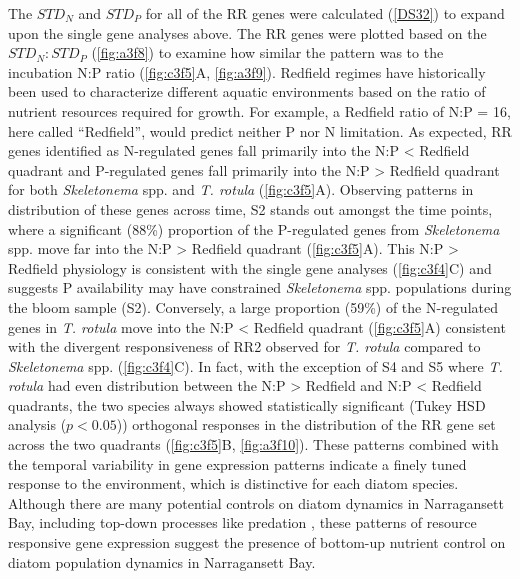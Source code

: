 The $STD_N$ and $STD_P$ for all of the RR genes were calculated (\ref{DS32}) to expand upon the single gene analyses above. The RR genes were plotted based on the $STD_N : STD_P$ (\cref{fig:a3f8}) to examine how similar the pattern was to the incubation N:P ratio (\cref{fig:c3f5}A, \cref{fig:a3f9}). Redfield regimes have historically been used to characterize different aquatic environments based on the ratio of nutrient resources required for growth. For example, a Redfield ratio of N:P = 16, here called ``Redfield'', would predict neither P nor N limitation. As expected, RR genes identified as N-regulated genes fall primarily into the N:P < Redfield quadrant and P-regulated genes fall primarily into the N:P > Redfield quadrant for both \textit{Skeletonema} spp. and \textit{T. rotula} (\cref{fig:c3f5}A). Observing patterns in distribution of these genes across time, S2 stands out amongst the time points, where a significant (88\%) proportion of the P-regulated genes from \textit{Skeletonema} spp. move far into the N:P > Redfield quadrant (\cref{fig:c3f5}A). This N:P > Redfield physiology is consistent with the single gene analyses (\cref{fig:c3f4}C) and suggests P availability may have constrained \textit{Skeletonema} spp. populations during the bloom sample (S2). Conversely, a large proportion (59\%) of the N-regulated genes in \textit{T. rotula} move into the N:P < Redfield quadrant (\cref{fig:c3f5}A) consistent with the divergent responsiveness of RR2 observed for \textit{T. rotula} compared to \textit{Skeletonema} spp. (\cref{fig:c3f4}C). In fact, with the exception of S4 and S5 where \textit{T. rotula} had even distribution between the N:P > Redfield and N:P < Redfield quadrants, the two species always showed statistically significant (Tukey HSD analysis ($p<0.05$)) orthogonal responses in the distribution of the RR gene set across the two quadrants (\cref{fig:c3f5}B, \cref{fig:a3f10}). These patterns combined with the temporal variability in gene expression patterns indicate a finely tuned response to the environment, which is distinctive for each diatom species. Although there are many potential controls on diatom dynamics in Narragansett Bay, including top-down processes like predation \citep{Martin1970, Lawerence2012}, these patterns of resource responsive gene expression suggest the presence of bottom-up nutrient control on diatom population dynamics in Narragansett Bay.\par

